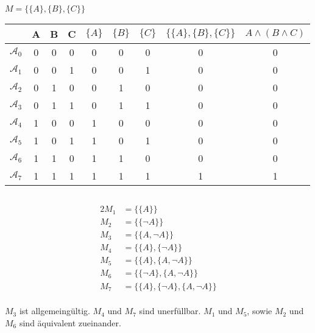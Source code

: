 \documentclass[10pt,a4paper,oneside,ngerman,numbers=noenddot]{scrartcl}
\begin{document}
\subsubsection{} %
$M = \{\{A\}, \{B\}, \{C\}\}$\\
\begin{tabular}{c|ccc|ccc|cc}
& A & B & C & $\{A\}$ & $\{B\}$ & $\{C\}$ & $\{\{A\}, \{B\}, \{C\}\}$ & $A \wedge (B \wedge C)$\\
\hline
$\mathcal{A}_{0}$ & 0 & 0 & 0 & 0 & 0 & 0 & 0 & 0 \\
$\mathcal{A}_{1}$ & 0 & 0 & 1 & 0 & 0 & 1 & 0 & 0 \\
$\mathcal{A}_{2}$ & 0 & 1 & 0 & 0 & 1 & 0 & 0 & 0\\
$\mathcal{A}_{3}$ & 0 & 1 & 1 & 0 & 1 & 1 & 0 & 0\\
$\mathcal{A}_{4}$ & 1 & 0 & 0 & 1 & 0 & 0 & 0 & 0\\
$\mathcal{A}_{5}$ & 1 & 0 & 1 & 1 & 0 & 1 & 0 & 0\\
$\mathcal{A}_{6}$ & 1 & 1 & 0 & 1 & 1 & 0 & 0 & 0\\
$\mathcal{A}_{7}$ & 1 & 1 & 1 & 1 & 1 & 1 & 1 & 1\\
\end{tabular}
\subsection{} %
\begin{alignat*}{2}
M_{1} &= \{\{A\}\} \\
M_{2} &= \{\{\neg A\}\} \\
M_{3} &= \{\{A, \neg A\}\} \\
M_{4} &= \{\{A\}, \{\neg A\}\} \\
M_{5} &= \{\{A\}, \{A, \neg A\}\} \\
M_{6} &= \{\{\neg A\}, \{A, \neg A\}\} \\
M_{7} &= \{\{A\}, \{\neg A\}, \{A, \neg A\}\}
\end{alignat*}\\
$M_{3}$ ist allgemeingültig. $M_{4}$ und $M_{7}$ sind unerfüllbar. $M_{1}$ und $M_{5}$, sowie $M_{2}$ und $M_{6}$ sind äquivalent zueinander.

\end{document}
